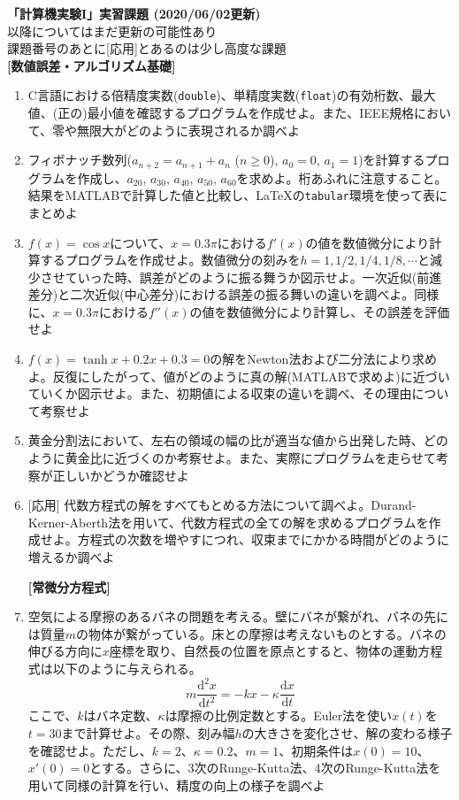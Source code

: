 \documentclass[11pt]{jarticle}
\begin{document}
\noindent
{\bf\large 「計算機実験I」実習課題 (2020/06/02更新)}
\\[-0.5em]

\noindent
[対角化]以降についてはまだ更新の可能性あり\\[-0.5em]

\noindent
課題番号のあとに[応用]とあるのは少し高度な課題\\[-0.5em]

{\bf [数値誤差・アルゴリズム基礎]}
\begin{enumerate}
\item C言語における倍精度実数({\tt double})、単精度実数({\tt float})の有効桁数、最大値、(正の)最小値を確認するプログラムを作成せよ。また、IEEE規格において、零や無限大がどのように表現されるか調べよ
  
\item フィボナッチ数列($a_{n+2}=a_{n+1}+a_n$ ($n \ge 0$), $a_0=0$, $a_1=1$)を計算するプログラムを作成し、$a_{20}$, $a_{30}$, $a_{40}$, $a_{50}$, $a_{60}$を求めよ。桁あふれに注意すること。結果をMATLABで計算した値と比較し、\LaTeX の{\tt tabular}環境を使って表にまとめよ
  
\item $f(x)=\cos x$について、$x=0.3\pi$における$f'(x)$の値を数値微分により計算するプログラムを作成せよ。数値微分の刻みを$h=1,1/2,1/4,1/8,\cdots$と減少させていった時、誤差がどのように振る舞うか図示せよ。一次近似(前進差分)と二次近似(中心差分)における誤差の振る舞いの違いを調べよ。同様に、$x=0.3\pi$における$f''(x)$の値を数値微分により計算し、その誤差を評価せよ
  
\item $f(x)=\tanh x + 0.2 x + 0.3 = 0$の解をNewton法および二分法により求めよ。反復にしたがって、値がどのように真の解(MATLABで求めよ)に近づいていくか図示せよ。また、初期値による収束の違いを調べ、その理由について考察せよ
  
\item 黄金分割法において、左右の領域の幅の比が適当な値から出発した時、どのように黄金比に近づくのか考察せよ。また、実際にプログラムを走らせて考察が正しいかどうか確認せよ

\item \mbox{} [応用] 代数方程式の解をすべてもとめる方法について調べよ。Durand-Kerner-Aberth法を用いて、代数方程式の全ての解を求めるプログラムを作成せよ。方程式の次数を増やすにつれ、収束までにかかる時間がどのように増えるか調べよ

  \hspace*{-2em} {\bf [常微分方程式]}

\item 空気による摩擦のあるバネの問題を考える。壁にバネが繋がれ、バネの先には質量$m$の物体が繋がっている。床との摩擦は考えないものとする。バネの伸びる方向に$x$座標を取り、自然長の位置を原点とすると、物体の運動方程式は以下のように与えられる。
  \[
  m\frac{\mathrm{d} ^2x}{\mathrm{d} t^2} = -kx - \kappa \frac{\mathrm{d} x}{\mathrm{d} t} 
  \]
  ここで、$k$はバネ定数、$\kappa$は摩擦の比例定数とする。Euler法を使い$x(t)$を$t=30$まで計算せよ。その際、刻み幅$h$の大きさを変化させ、解の変わる様子を確認せよ。ただし、$k=2$、$\kappa = 0.2$、$m = 1$、初期条件は$x(0) = 10$、$x'(0) = 0$とする。さらに、3次のRunge-Kutta法、4次のRunge-Kutta法を用いて同様の計算を行い、精度の向上の様子を調べよ


\end{enumerate}
\end{document}
